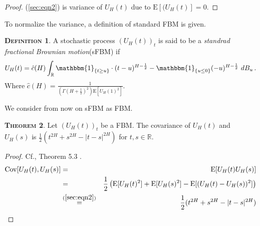 \documentclass[a4paper, twoside, 11pt]{article}
\theoremstyle{definition}
\newtheorem{definition}{\scshape Definition}[section]
\newtheorem{theorem}[definition]{\scshape Theorem}
\newcommand{\brkt}[1]{\left({#1} \right)}
\begin{document}
\begin{proof}
  (\ref{sec:eqn2}) is variance of $U_H(t)$ due to $\mathrm{E}[(U_H(t)] = 0$.
\end{proof}
To normalize the variance, a definition of standard FBM is given.

\begin{definition}
  A stochastic process $(U_H(t))_{t}$ is said to be a \emph{standrad fractional Brownian motion}(sFBM) if
  \begin{equation}
U_H(t) = \hat{c}(H) \int_{\mathbb{R}} \mathbbm{1}_{\{t\ge u\}}\cdot (t-u)^{H-\frac{1}{2}} - \mathbbm{1}_{\{u\le 0\}} (-u)^{H-\frac{1}{2}} \, \mathop{dB_u}.
\label{sec:eqn3}
\end{equation}
Where $\hat{c}(H) = \frac{1}{(\Gamma(H+\frac{1}{2})^2)\mathrm{E}[U_H(1)^2]} $.
\end{definition}
We consider from now on sFBM as FBM.

\begin{theorem}
  Let  $(U_H(t))_{t}$ be a FBM. The covariance of $U_H(t)$ and $U_H(s)$ is $ \frac{1}{2}(t^{2H} + s^{2H} - |t-s|^{2H})$ for $t, s \in \mathbb{R}$.
\end{theorem}

\begin{proof}
  Cf.\cite{mandelbrot}, Theorem 5.3 .
  \begin{eqnarray}
	\mathrm{Cov}[U_H(t), U_H(s)] &=& \mathrm{E}[U_H(t)U_H(s)] \nonumber\\
	&=& \frac{1}{2}\brkt{\mathrm{E}[U_H(t)^2] + \mathrm{E}[U_H(s)^2] - \mathrm{E}[(U_H(t) - U_H(s))^2]} \nonumber\\
	&\overset{(\ref{sec:eqn2})}{=}& \frac{1}{2}(t^{2H} + s^{2H} - |t-s|^{2H})
	\label{sec:eqn4}
  \end{eqnarray}
\end{proof}
\end{document}
